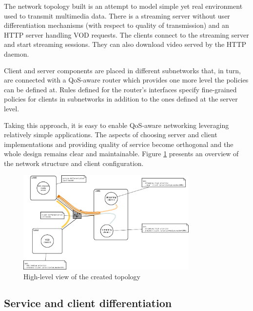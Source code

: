 \documentclass[11pt]{book}
\begin{document}
        The network topology built is an attempt to model simple yet real environment used to transmit multimedia data.
        There is a streaming server without user differentiation mechanisms (with respect to quality of transmission)
        and an HTTP server handling VOD requests. The clients connect to the streaming server and start streaming
        sessions. They can also download video served by the HTTP daemon.

        Client and server components are placed in different subnetworks that, in turn, are connected with a QoS-aware
        router which provides one more level the policies can be defined at. Rules defined for the router's interfaces
        specify fine-grained policies for clients in subnetworks in addition to the ones defined at the server level.

        Taking this approach, it is easy to enable QoS-aware networking leveraging relatively simple applications. The
        aspects of choosing server and client implementations and providing quality of service become orthogonal and the
        whole design remains clear and maintainable. Figure \ref{fig:cs:scenario} presents an overview of the network
        structure and client configuration.
      
        \begin{figure}[H]
          \begin{center}
            \includegraphics[width=0.8\textwidth]{img/test-case/diagram.pdf}
          \end{center}

          \caption{High-level view of the created topology}
          \label{fig:cs:scenario}
        \end{figure}
      

      \subsection{Service and client differentiation}
      \label{sub:uc:diff}
\end{document}
